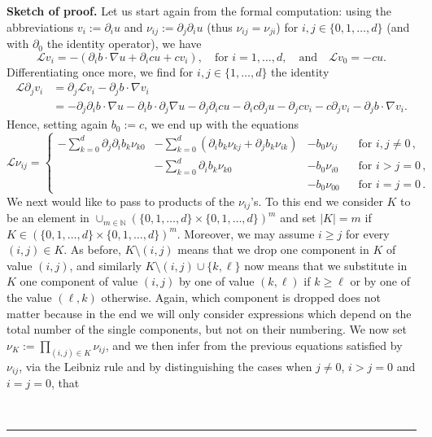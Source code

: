 \documentclass[a4paper,10pt]{article}
\newenvironment{proof}[1][Proof]{\noindent\textbf{#1.} }{\ \rule{0.5em}{0.5em}}
\begin{document}
\begin{proof}[Sketch of proof]
Let us start again from the formal computation: using the abbreviations $v_{i}:=\partial_{i}u$ and $\nu_{ij}:= \partial_j \partial_{i} u$ (thus $\nu_{ij} = \nu_{ji}$) for $i,j \in \{0,1,\ldots,d\}$ (and with $\partial_0$ the identity operator), we have 
\begin{equation*}
\mathcal{L}v_{i}=-(\partial_{i}b\cdot\nabla u+ \partial_{i}
c u +cv_{i})  ,\quad \text{for } i=1,\ldots,d, \quad \text{and} \quad \mathcal{L}v_{0}=-c u  .
\end{equation*}
Differentiating once more, we find for $i,j \in \{1,\ldots,d\}$ the identity 
\begin{align*}
\mathcal{L} \partial_{j} v_{i} & =  \partial_{j} \mathcal{L} v_{i} - \partial_{j} b \cdot \nabla v_{i} \\
  & = -  \partial_{j} \partial_{i}b\cdot\nabla u - \partial_{i}b\cdot \partial_{j} \nabla u 
  - \partial_{j} \partial_{i} c u -  \partial_{i} c \partial_{j} u  - \partial_{j}c v_{i} 
  - c \partial_{j} v_{i} - \partial_{j} b \cdot \nabla v_{i} .
\end{align*}
Hence, setting again $b_0 := c$, we end up with the equations 
\begin{equation*}
  \mathcal{L} \nu_{ij} =  \left\{ \begin{array}{llll} \displaystyle - \sum_{k=0}^{d} \partial_{j} \partial_{i}b_k \nu_{k0} & \displaystyle - \sum_{k=0}^{d} ( \partial_{i} b_k \nu_{kj} + \partial_j b_k \nu_{ik})  & - b_0 \nu_{ij} \quad & \text{for } i,j \neq 0 \, , \\
   & \displaystyle - \sum_{k=0}^{d} \partial_{i} b_k \nu_{k0} & - b_0 \nu_{i0} & \text{for } i>j=0 \,, \\[0.6cm]
  & & - b_0 \nu_{00} & \text{for } i=j=0 \, .
  \end{array} \right.
\end{equation*}
We next would like to pass to products of the $\nu_{ij}$'s. To this end we consider $K$ to be an element in $\cup_{m \in \mathbb{N}} ( \{0,1,\ldots,d\} \times  \{0,1,\ldots,d\} )^m$ and set $|K| = m$ if $K \in ( \{0,1,\ldots,d\} \times  \{0,1,\ldots,d\} )^m$. Moreover, we may assume $i \geq j$ for every $(i,j) \in K$. As before, $K \setminus (i,j)$ means that we drop one component in $K$ of value $(i,j)$, and similarly $K \setminus (i,j) \cup \{k,\ell\}$ now means that we substitute in $K$ one component of value $(i,j)$ by one of value $(k,\ell)$ if $k \geq \ell$ or by one of the value $(\ell,k)$ otherwise. Again, which component is dropped does not matter because in the end we will only consider expressions which depend on the total number of the single components, but not on their numbering. We now set $\nu_K := \prod_{(i,j) \in K} \nu_{ij}$, and we then infer from the previous equations satisfied by $\nu_{ij}$, via the Leibniz rule and by distinguishing the cases when $j \neq 0$, $i>j=0$ and $i=j=0$, that

\end{proof}
\end{document}

